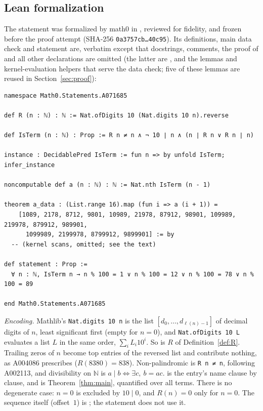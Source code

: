 \documentclass[11pt]{amsart}
\theoremstyle{plain}
\theoremstyle{definition}
\newcommand{\N}{\mathbb{N}}
\newcommand{\len}{\ell}
\begin{document}
\subsection*{Lean formalization}
The statement was formalized by math0 in , reviewed for fidelity, and frozen before the proof attempt (SHA-256 \texttt{0a3757cb\dots 40c95}). Its definitions, main data check and statement are, verbatim except that docstrings, comments, the proof of  and all other declarations are omitted (the latter are , and the lemmas and kernel-evaluation helpers that serve the data check; five of these lemmas are reused in Section~\ref{sec:proof}):
\begin{lstlisting}
namespace Math0.Statements.A071685

def R (n : ℕ) : ℕ := Nat.ofDigits 10 (Nat.digits 10 n).reverse

def IsTerm (n : ℕ) : Prop := R n ≠ n ∧ ¬ 10 ∣ n ∧ (n ∣ R n ∨ R n ∣ n)

instance : DecidablePred IsTerm := fun n => by unfold IsTerm; infer_instance

noncomputable def a (n : ℕ) : ℕ := Nat.nth IsTerm (n - 1)

theorem a_data : (List.range 16).map (fun i => a (i + 1)) =
    [1089, 2178, 8712, 9801, 10989, 21978, 87912, 98901, 109989, 219978, 879912, 989901,
      1099989, 2199978, 8799912, 9899901] := by
  -- (kernel scans, omitted; see the text)

def statement : Prop :=
  ∀ n : ℕ, IsTerm n → n % 100 = 1 ∨ n % 100 = 12 ∨ n % 100 = 78 ∨ n % 100 = 89

end Math0.Statements.A071685
\end{lstlisting}

\emph{Encoding.} Mathlib's \texttt{Nat.digits 10 n} is the list $[d_0,\dots,d_{\len(n)-1}]$ of decimal digits of $n$, least significant first (empty for $n=0$), and \texttt{Nat.ofDigits 10 L} evaluates a list $L$ in the same order, $\sum_i L_i10^i$. So  is $R$ of Definition~\ref{def:R}. Trailing zeros of $n$ become top entries of the reversed list and contribute nothing, as A004086 prescribes ($R(8380)=838$). Non-palindromic is \texttt{R n ≠ n}, following A002113, and divisibility on $\N$ is $a\mid b\iff\exists c,\ b=ac$.  is the entry's name clause by clause, and  is Theorem~\ref{thm:main}, quantified over all terms. There is no degenerate case: $n=0$ is excluded by $10\mid0$, and $R(n)=0$ only for $n=0$. The sequence itself (offset~$1$) is ; the statement does not use it.
\end{document}
